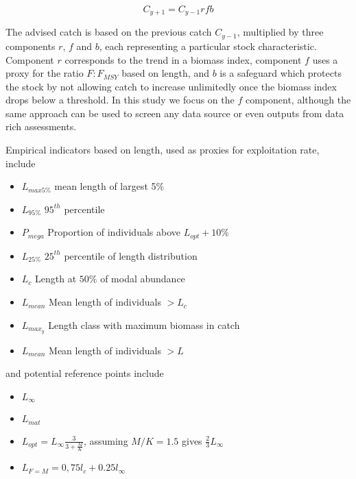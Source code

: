 \documentclass[12pt,doublespacing,a4paper]{ouparticle}
\begin{document}
\begin{equation} C_{y+1} = C_{y-1}rfb \end{equation}

The advised catch is based on the previous catch $C_{y-1}$, multiplied by three components $r$, $f$ and $b$, each representing a particular stock characteristic. Component $r$ corresponds to the trend in a biomass index, component $f$ uses a proxy  for the ratio $F:F_{MSY}$ based on length, and $b$ is a safeguard which protects the stock by not allowing catch to increase unlimitedly once the biomass index drops below a threshold. In this study we focus on the $f$ component, although the same approach can be used to screen any data source or even outputs from data rich assessments.

Empirical indicators based on length, used as proxies for exploitation rate, include

\begin{itemize}
 \item $L_{max5\%}$ mean length of largest 5\%
 \item $L_{95\%}$ $95^{th}$ percentile
 \item $P_{mega}$ Proportion of individuals above $L_{opt} + 10\%$
 \item $L_{25\%}$ $25^{th}$ percentile of length distribution
 \item $L_{c}$ Length at $50\%$ of modal abundance
 \item $L_{mean}$ Mean length of individuals $> L_c$
 \item $L_{max_{y}}$ Length class with maximum biomass in catch
 \item $L_{mean}$ Mean length of individuals $> L$
\end{itemize}

and potential reference points include

\begin{itemize}
 \item $L_{\infty}$
 \item $L_{mat}$
 \item $L_{opt} = L_{\infty}\frac{3}{3+\frac{M}{K}}$, assuming $M/K = 1.5$ gives $\frac{2}{3}L_{\infty}$
 \item $L_{F=M} =  0,75l_c+0.25l_{\infty}$
\end{itemize}
\end{document}
